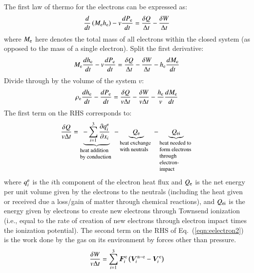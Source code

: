 \documentclass{warpdoc}
\renewcommand{\vec}[1]{\bm{#1}}
\begin{document}
The first law of thermo for the electrons can be expressed as:
%
\begin{equation}
 \frac{d }{d t}\left(M_{\rm e} h_{\rm e}\right) - v \frac{d P_{\rm e}}{dt} = \frac{\delta Q}{\Delta t}-\frac{\delta W}{\Delta t}
\end{equation}
%
where $M_{\rm e}$ here denotes the total mass of all electrons within the closed system (as opposed to the mass of a single electron).  Split the first derivative:
%
\begin{equation}
 M_{\rm e}\frac{d h_{\rm e}}{d t} - v \frac{d P_{\rm e}}{dt} = \frac{\delta Q}{\Delta t}-\frac{\delta W}{\Delta t}-h_{\rm e}\frac{d M_{\rm e}}{d t}
\end{equation}
%
Divide through by the volume of the system $v$:
%
\begin{equation}
\rho_{\rm e} \frac{d h_{\rm e}}{d t} -  \frac{d P_{\rm e}}{dt} = \frac{\delta Q}{v \Delta t}-\frac{\delta W}{v \Delta t}
-\frac{h_{\rm e}}{v}\frac{d M_{\rm e}}{d t}
\label{eqn:eelectron2}
\end{equation}
%  
The first term on the RHS corresponds to:
%
\begin{equation}
\frac{\delta Q}{v \Delta t}= 
\underbrace{
  -\sum_{i=1}^{3}\frac{\partial q_i^{\rm e}}{\partial x_i}
}_{\begin{minipage}{1.7cm}\flushleft \footnotesize heat addition by conduction\end{minipage}}
-
\underbrace{
Q_{\rm e}
}_{\begin{minipage}{1.7cm}\flushleft \footnotesize heat exchange with neutrals\end{minipage}}
-
\underbrace{
Q_{\rm ei}
}_{\begin{minipage}{1.7cm}\flushleft \footnotesize heat needed to form electrons through electron-impact \end{minipage}}
\end{equation}
%
where $q^{\rm e}_i$ is the $i$th component of the electron heat flux and $Q_{\rm e}$ is the net energy per unit volume given by the electrons to the neutrals (including the heat given or received due a loss/gain of matter through chemical reactions), and $Q_{\rm ei}$ is the energy given by electrons to create new electrons through Townsend ionization (i.e., equal to the rate of creation of new electrons through electron impact times the ionization potential). The second term on the RHS of Eq.\ (\ref{eqn:eelectron2}) is the work done by the gas on its environment by forces other than pressure. 
%
\begin{equation}
\frac{\delta W}{v \Delta t}= \sum_{i=1}^3 \vec{F}_i^{\rm e} \left( \vec{V}_i^{{\rm n}-{\rm e}}-\vec{V}_i^{\rm e} \right)
\end{equation}
\end{document}
